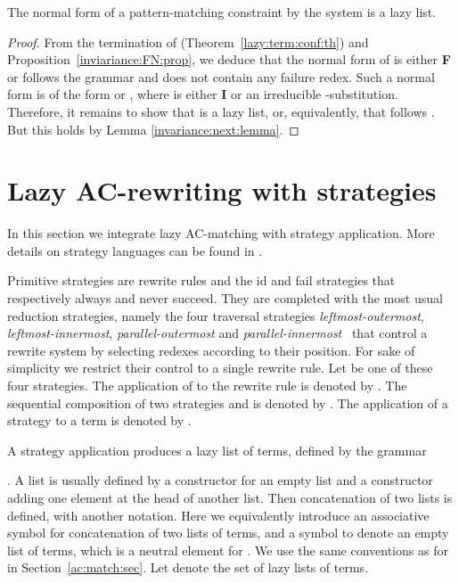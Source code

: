 \documentclass[submission,copyright,creativecommons]{eptcs}
\newcommand \lazy{}
\numberwithin{subcase}{case}
\begin{document}
\begin{theorem}
\label{NF:theorem}
The normal form of a pattern-matching constraint  by the system 
 \lazy  is a lazy list.
\end{theorem}
\begin{proof}
From  the termination of \lazy (Theorem~\ref{lazy:term:conf:th}) and
Proposition~\ref{inviariance:FN:prop}, we deduce that the normal form of \lazy is
either \textbf{F} or  follows the grammar  and does not contain any
failure redex. Such a normal form is of the form  or ,
where  is either \textbf{I} or an irreducible -substitution.
Therefore, it remains to show that  is a lazy list,
or, equivalently, that  follows .
But this holds by Lemma \ref{invariance:next:lemma}.
\end{proof}


\section{Lazy AC-rewriting with strategies}
\label{lazy:rewriting:sec}

In this section we integrate lazy AC-matching with strategy application.   
More details on strategy languages can be found in 
\cite{BKKR-IJFCS-2001,Vis01-rta,Marti-OlietMV05}.

 
Primitive strategies are rewrite rules  and the
\textsf{id} and \textsf{fail} strategies that respectively always and
never succeed. They are completed with the most
usual reduction strategies, namely the four traversal strategies
\textit{leftmost-outermost}, \textit{leftmost-innermost},
\textit{parallel-outermost} and \textit{parallel-innermost}~\cite[Definition
4.9.5]{Terese03} that control a rewrite system by selecting redexes according to
their position. For sake of simplicity we restrict their control to a single
rewrite rule. Let  be one of these four strategies. The application of  to
the rewrite rule  is denoted by . 
The sequential composition of two strategies  and  is denoted by .
The application of a strategy  to a term  is denoted by .



A strategy application produces a lazy list of terms, defined by the grammar
   
  .
 A list is usually defined by a constructor for an empty list and a constructor
adding one element at the head of another list. Then concatenation of two
lists is defined, with another notation. Here we equivalently introduce an
associative symbol  for concatenation of two lists of terms, and a symbol
 to denote an empty list of terms, which is a neutral
element for . We use the same conventions as for  in
Section~\ref{ac:match:sec}. Let  denote the set of lazy
lists of terms.
\end{document}
